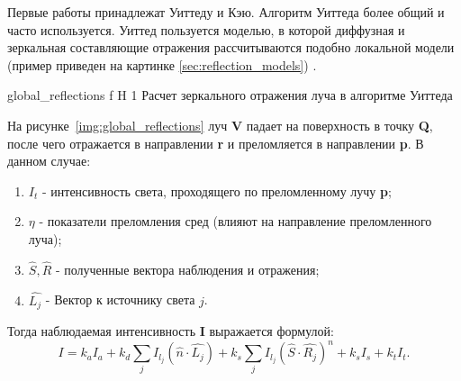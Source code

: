 Первые работы принадлежат Уиттеду и Кэю. Алгоритм Уиттеда более общий и часто используется.
Уиттед пользуется моделью, в которой диффузная и зеркальная составляющие отражения рассчитываются подобно локальной модели (пример приведен на картинке \ref{sec:reflection_models}) \cite{Rodgers}.



{global_reflections} %
{f} %
{H} %
{1\textwidth} %
{Расчет зеркального отражения луча в алгоритме Уиттеда} %


На рисунке~\ref{img:global_reflections} луч \textbf{V} падает на поверхность в точку \textbf{Q}, после чего отражается в направлении \textbf{r} и преломляется
в направлении \textbf{p}.
В данном случае:
\begin{enumerate}
	\item $I_t$ - интенсивность света, проходящего по преломленному лучу \textbf{p};
	\item $\eta$ - показатели преломления сред (влияют на направление преломленного луча);
	\item $\hat{S},\hat{R}$ - полученные вектора наблюдения и отражения;
	\item $\hat{L_j}$ - Вектор к источнику света $j$.

\end{enumerate}

Тогда наблюдаемая интенсивность \textbf{I} выражается формулой:
\begin{equation} 
	I = k_aI_a + k_d \sum_{j} I_{l_j}(\hat{n} \cdot \hat{L_j}) + k_s \sum_{j} I_{l_j}(\hat{S} \cdot \hat{R_j})^n + k_sI_s + k_tI_t.
	\label{eq:intensivity}
\end{equation}

